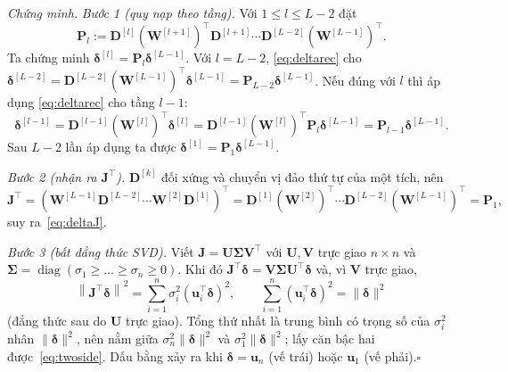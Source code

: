 {\noindent\textit{Chứng minh.}\;
\emph{Bước 1 (quy nạp theo tầng).} Với $1\le l\le L-2$ đặt
\[
  \mathbf{P}_l := \mathbf{D}^{[l]}\left(\mathbf{W}^{[l+1]}\right)^{\!\top}\mathbf{D}^{[l+1]}\cdots
  \mathbf{D}^{[L-2]}\left(\mathbf{W}^{[L-1]}\right)^{\!\top}.
\]
Ta chứng minh $\boldsymbol{\delta}^{[l]}=\mathbf{P}_l\boldsymbol{\delta}^{[L-1]}$.
Với $l=L-2$, \eqref{eq:deltarec} cho
$\boldsymbol{\delta}^{[L-2]}=\mathbf{D}^{[L-2]}(\mathbf{W}^{[L-1]})^{\top}\boldsymbol{\delta}^{[L-1]}
=\mathbf{P}_{L-2}\boldsymbol{\delta}^{[L-1]}$. Nếu đúng với $l$ thì áp dụng
\eqref{eq:deltarec} cho tầng $l-1$:
\[
  \boldsymbol{\delta}^{[l-1]}
  = \mathbf{D}^{[l-1]}\left(\mathbf{W}^{[l]}\right)^{\!\top}\boldsymbol{\delta}^{[l]}
  = \mathbf{D}^{[l-1]}\left(\mathbf{W}^{[l]}\right)^{\!\top}\mathbf{P}_l\boldsymbol{\delta}^{[L-1]}
  = \mathbf{P}_{l-1}\boldsymbol{\delta}^{[L-1]} .
\]
Sau $L-2$ lần áp dụng ta được $\boldsymbol{\delta}^{[1]}=\mathbf{P}_1\boldsymbol{\delta}^{[L-1]}$.

\emph{Bước 2 (nhận ra $\mathbf{J}^{\top}$).} $\mathbf{D}^{[k]}$ đối xứng và chuyển vị đảo
thứ tự của một tích, nên
\[
  \mathbf{J}^{\!\top}
  = \left(\mathbf{W}^{[L-1]}\mathbf{D}^{[L-2]}\cdots\mathbf{W}^{[2]}\mathbf{D}^{[1]}\right)^{\!\top}
  = \mathbf{D}^{[1]}\left(\mathbf{W}^{[2]}\right)^{\!\top}\cdots
    \mathbf{D}^{[L-2]}\left(\mathbf{W}^{[L-1]}\right)^{\!\top}
  = \mathbf{P}_1 ,
\]
suy ra~\eqref{eq:deltaJ}.

\emph{Bước 3 (bất đẳng thức SVD).} Viết $\mathbf{J}=\mathbf{U}\boldsymbol{\Sigma}\mathbf{V}^{\top}$
với $\mathbf{U},\mathbf{V}$ trực giao $n\times n$ và
$\boldsymbol{\Sigma}=\operatorname{diag}(\sigma_1\ge\dots\ge\sigma_n\ge0)$. Khi đó
$\mathbf{J}^{\top}\boldsymbol{\delta}=\mathbf{V}\boldsymbol{\Sigma}\mathbf{U}^{\top}\boldsymbol{\delta}$ và, vì
$\mathbf{V}$ trực giao,
\[
  \left\|\mathbf{J}^{\top}\boldsymbol{\delta}\right\|^{2}
  = \sum_{i=1}^{n}\sigma_i^{2}\left(\mathbf{u}_i^{\top}\boldsymbol{\delta}\right)^{2},
  \qquad
  \sum_{i=1}^{n}\left(\mathbf{u}_i^{\top}\boldsymbol{\delta}\right)^{2}=\|\boldsymbol{\delta}\|^{2}
\]
(đẳng thức sau do $\mathbf{U}$ trực giao). Tổng thứ nhất là trung bình có trọng số của
$\sigma_i^2$ nhân $\|\boldsymbol{\delta}\|^2$, nên nằm giữa $\sigma_n^{2}\|\boldsymbol{\delta}\|^{2}$ và
$\sigma_1^{2}\|\boldsymbol{\delta}\|^{2}$; lấy căn bậc hai được~\eqref{eq:twoside}. Dấu bằng
xảy ra khi $\boldsymbol{\delta}=\mathbf{u}_n$ (vế trái) hoặc $\mathbf{u}_1$ (vế phải).\hfill$\square$

}
